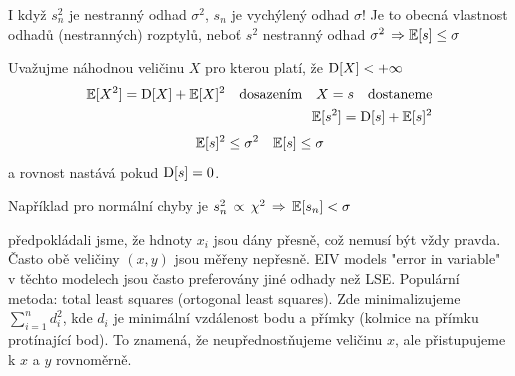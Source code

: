 \begin{remark}
I když $ s^{2}_{n} $ je nestranný odhad $ \sigma^{2} $, $ s_{n} $ je vychýlený odhad $ \sigma $!
Je to obecná vlastnost odhadů (nestranných) rozptylů, neboť $ s^{2} $ nestranný odhad $ \sigma^{2} \, \Rightarrow \mathbb{E}[s] \leq \sigma $ 
\end{remark}


Uvažujme náhodnou veličinu $ X $  pro kterou platí, že $ \mathrm{D} [ X ] < + \infty $
\begin{equation*}
\begin{aligned}
 \mathbb{E} [X^{2}] = \mathrm{D} [ X ] +  \mathbb{E} [X]^{2} \quad \text{dosazením} \quad X = s \quad \text{dostaneme} \\
  \mathbb{E} [s^{2}] = \mathrm{D} [ s ] +  \mathbb{E} [s]^{2}
 \end{aligned} 
\end{equation*}
\begin{equation}
\mathbb{E} [s]^{2} \leq \sigma^{2} \quad \mathbb{E} [s] \leq \sigma
\end{equation}
a rovnost nastává pokud $ \mathrm{D} [ s ] = 0 $.

Například pro normální chyby je $ s_{n}^{2} \, \propto \, \chi^{2} \, \Rightarrow \, \mathbb{E} [s_{n}] < \sigma $

\begin{remark}
	předpokládali jsme, že hdnoty $ x_{i} $ jsou dány přesně, což nemusí být vždy pravda. Často obě veličiny $ (x,y) $ jsou měřeny nepřesně. EIV models "error in variable" v těchto modelech jsou často preferovány jiné odhady než LSE. Populární metoda: total least squares (ortogonal least squares). Zde minimalizujeme $ \sum_{i=1}^{n} d_{i}^{2} $, kde $ d_{i} $ je minimální vzdálenost bodu a přímky (kolmice na přímku protínající bod). To znamená, že neupřednostňujeme veličinu $ x $, ale přistupujeme k $ x $ a $ y $ rovnoměrně.
\end{remark}

